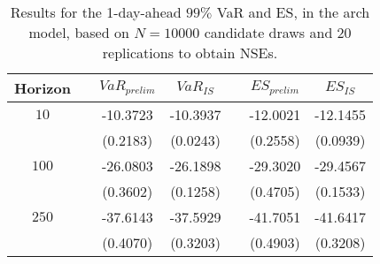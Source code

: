 \begin{table}[h] 
\centering 
\caption{Results for the 1-day-ahead $99\%$ VaR and ES, in the arch model, based on $N=10000$ candidate draws and $20$ replications to obtain NSEs.} 
\label{tab:res_arch} 
\begin{tabular}{ccccccc}  
 Horizon & & $VaR_{prelim}$ & $VaR_{IS}$ & & $ES_{prelim}$ & $ES_{IS}$ \\ \hline 
$10$ & & -10.3723 & -10.3937 & & -12.0021 & -12.1455  \\ 
 & & (0.2183) & (0.0243) & & (0.2558) & (0.0939)   \\ [1ex] 
$100$ & & -26.0803 & -26.1898 & & -29.3020 & -29.4567  \\ 
 & & (0.3602) & (0.1258) & & (0.4705) & (0.1533)   \\ [1ex] 
$250$ & & -37.6143 & -37.5929 & & -41.7051 & -41.6417  \\ 
 & & (0.4070) & (0.3203) & & (0.4903) & (0.3208)   \\ [1ex] 
\hline 
\end{tabular} 
\end{table} 
